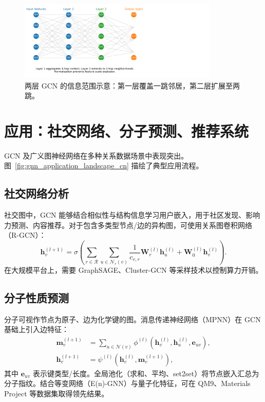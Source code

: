 \documentclass[UTF8,zihao=-4]{ctexart}
\begin{document}
\begin{figure}[H]
  \centering
  \includegraphics[width=0.85\textwidth]{gcn_layer_flow.png}
  \caption{两层 GCN 的信息范围示意：第一层覆盖一跳邻居，第二层扩展至两跳。}
  \label{fig:gcn_layer_flow_cn}
\end{figure}
\FloatBarrier

\section{应用：社交网络、分子预测、推荐系统}
GCN 及广义图神经网络在多种关系数据场景中表现突出。图~\ref{fig:gnn_application_landscape_cn} 描绘了典型应用流程。

\subsection{社交网络分析}
社交图中，GCN 能够结合相似性与结构信息学习用户嵌入，用于社区发现、影响力预测、内容推荐。对于包含多类型节点/边的异构图，可使用关系图卷积网络（R-GCN）：
\begin{equation}
  \mathbf{h}_v^{(l+1)} = \sigma \left( \sum_{r \in \mathcal{R}} \sum_{u \in \mathcal{N}_r(v)} \frac{1}{c_{v,r}} \mathbf{W}_r^{(l)} \mathbf{h}_u^{(l)} + \mathbf{W}_0^{(l)} \mathbf{h}_v^{(l)} \right).
\end{equation}
在大规模平台上，需要 GraphSAGE、Cluster-GCN 等采样技术以控制算力开销。

\subsection{分子性质预测}
分子可视作节点为原子、边为化学键的图。消息传递神经网络（MPNN）在 GCN 基础上引入边特征：
\begin{align}
  \mathbf{m}_v^{(l+1)} &= \sum_{u \in \mathcal{N}(v)} \phi^{(l)}\left(\mathbf{h}_v^{(l)}, \mathbf{h}_u^{(l)}, \mathbf{e}_{uv}\right), \\
  \mathbf{h}_v^{(l+1)} &= \psi^{(l)}\left(\mathbf{h}_v^{(l)}, \mathbf{m}_v^{(l+1)}\right),
\end{align}
其中 $\mathbf{e}_{uv}$ 表示键类型/长度。全局池化（求和、平均、set2set）将节点嵌入汇总为分子指纹。结合等变网络（E(n)-GNN）与量子化特征，可在 QM9、Materials Project 等数据集取得领先结果。
\end{document}
